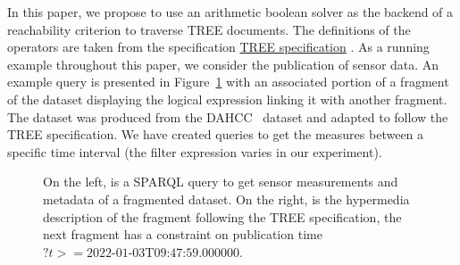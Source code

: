 In this paper, we propose to use an arithmetic boolean solver as the backend of a reachability criterion to traverse TREE documents.
The definitions of the operators are taken from the specification \href{https://treecg.github.io/specification/}{TREE specification} .
As a running example throughout this paper, we consider the publication of sensor data.
An example query is presented in Figure~\ref{lst:system} with an associated portion of a fragment of the dataset displaying the logical expression linking it with another fragment.
The dataset was produced from the DAHCC~\cite{dahcc_resource} dataset and adapted to follow the TREE specification.
We have created queries to get the measures between a specific time interval (the filter expression varies in our experiment).

\begin{figure}[h]
    \begin{minipage}{0.50\textwidth}
        \centering
        
    \end{minipage}
    \hspace{0.05\textwidth}
    \begin{minipage}{0.43\textwidth}
        \centering
        
    \end{minipage}
    \caption{On the left, is a SPARQL query to get sensor measurements and metadata of a fragmented dataset.
    On the right, is the hypermedia description of the fragment following the TREE specification, the next fragment
    has a constraint on publication time $?t>= \text{2022-01-03T09:47:59.000000}$.}
        \label{lst:system}
\end{figure}